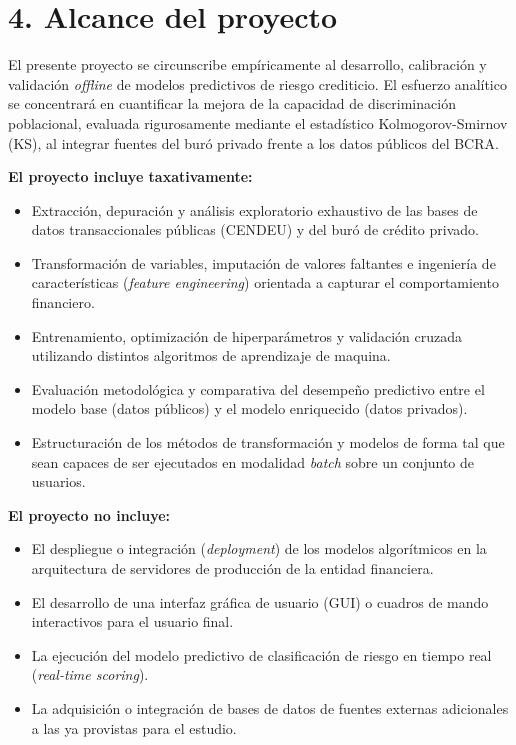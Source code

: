 \documentclass[
11pt, %
]{charter}
\begin{document}
\section{4. Alcance del proyecto}
\label{sec:alcance}

El presente proyecto se circunscribe empíricamente al desarrollo, calibración y validación \textit{offline} de modelos predictivos de riesgo crediticio. El esfuerzo analítico se concentrará en cuantificar la mejora de la capacidad de discriminación poblacional, evaluada rigurosamente mediante el estadístico Kolmogorov-Smirnov (KS), al integrar fuentes del buró privado frente a los datos públicos del BCRA.

\textbf{El proyecto incluye taxativamente:}
\begin{itemize}
\item Extracción, depuración y análisis exploratorio exhaustivo de las bases de datos transaccionales públicas (CENDEU) y del buró de crédito privado.
\item Transformación de variables, imputación de valores faltantes e ingeniería de características (\textit{feature engineering}) orientada a capturar el comportamiento financiero.
\item Entrenamiento, optimización de hiperparámetros y validación cruzada utilizando distintos algoritmos de aprendizaje de maquina.
\item Evaluación metodológica y comparativa del desempeño predictivo entre el modelo base (datos públicos) y el modelo enriquecido (datos privados).
\item Estructuración de los métodos de transformación y modelos de forma tal que sean capaces de ser ejecutados en modalidad \textit{batch} sobre un conjunto de usuarios.
\end{itemize}

\textbf{El proyecto no incluye:}
\begin{itemize}
\item El despliegue o integración (\textit{deployment}) de los modelos algorítmicos en la arquitectura de servidores de producción de la entidad financiera.
\item El desarrollo de una interfaz gráfica de usuario (GUI) o cuadros de mando interactivos para el usuario final.
\item La ejecución del modelo predictivo de clasificación de riesgo en tiempo real (\textit{real-time scoring}).
\item La adquisición o integración de bases de datos de fuentes externas adicionales a las ya provistas para el estudio.
\end{itemize}
\end{document}
